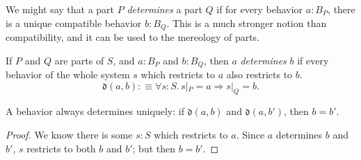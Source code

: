 We might say that a part $P$ \emph{determines} a part $Q$ if for every behavior $a : B_P$, there is a unique compatible behavior $b : B_Q$. This is a much stronger notion than compatibility, and it can be used to the mereology of parts.

\begin{defn}
If $P$ and $Q$ are parts of $S$, and $a : B_P$ and $b : B_Q$, then $a$ \emph{determines} $b$ if every behavior of the whole system $s$ which restricts to $a$ also restricts to $b$.
$$\mathfrak{d}(a, b) :\equiv \forall s : S.\, s|_P = a \Rightarrow s|_Q = b.$$
\end{defn}


\begin{lemma}
A behavior always determines uniquely: if $\mathfrak{d}(a, b)$ and $\mathfrak{d}(a, b')$, then $b = b'$.
\end{lemma}
\begin{proof}
We know there is some $s : S$ which restricts to $a$. Since $a$ determines $b$ and $b'$, $s$ restricts to both $b$ and $b'$; but then $b = b'$.
\end{proof}


